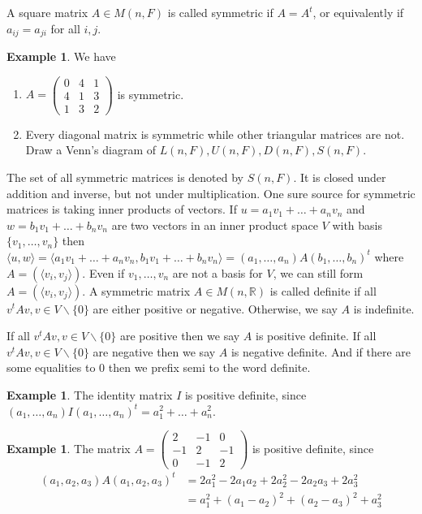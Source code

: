 \documentclass[12pt]{amsart}
\theoremstyle{definition}
\newtheorem{example}[theorem]{Example}
\begin{document}
\dfn A square matrix $A \in M(n, F)$ is called symmetric if $A = A^t$, or equivalently if $a_{ij} = a_{ji}$ for all $i, j$.

\begin{example} We have
\begin{enumerate}[\indent a.]
\item $A = \left(\begin{array}{ccc} 0 & 4 & 1\\ 4 & 1 & 3 \\ 1 & 3 & 2 \end{array}\right)$ is symmetric.
\item Every diagonal matrix is symmetric while other triangular matrices are not. Draw a Venn's diagram of $L(n,F), U(n,F), D(n,F), S(n,F)$.
\end{enumerate}
\end{example}

The set of all symmetric matrices is denoted by $S(n,F)$. It is closed under addition and inverse, but not under multiplication. One sure source for symmetric matrices is taking inner products of vectors. If $u = a_1 v_1 + \ldots + a_n v_n$ and $w = b_1 v_1 + \ldots + b_n v_n$ are two vectors in an inner product space $V$ with basis $\{v_1, \dots, v_n\}$ then $\langle u, w \rangle =  \langle a_1 v_1 + \ldots + a_n v_n, b_1 v_1 + \ldots + b_n v_n \rangle = (a_1, \dots , a_n)A(b_1, \dots , b_n)^t$ where $A = (\langle v_i, v_j \rangle)$. Even if $v_1, \dots, v_n$ are not a basis for $V$, we can still form $A = (\langle v_i, v_j \rangle)$.
\dfn A symmetric matrix $A \in M(n, \mathbb{R})$ is called definite if all $v^tAv, v \in V \backslash \{0\}$ are either positive or negative. Otherwise, we say $A$ is indefinite.

If all $v^tAv, v \in V \backslash \{0\}$ are positive then we say $A$ is positive definite. If all $v^tAv, v \in V \backslash \{0\}$ are negative then we say $A$ is negative definite. And if there are some equalities to 0 then we prefix semi to the word definite.

\begin{example}\label{} The identity matrix $I$ is positive definite, since $(a_1, \dots , a_n)I(a_1, \dots , a_n)^t = a_1^2 + \ldots + a_n^2$.
\end{example}

\begin{example}\label{} The matrix $A = \left(\begin{array}{ccc} 2 & -1 & 0 \\ -1 & 2 & -1 \\ 0 & -1 & 2 \end{array}\right)$ is positive definite, since
\begin{align*}
(a_1, a_2, a_3)A(a_1, a_2, a_3)^t & = 2a_1^2 - 2a_1a_2 + 2a_2^2 - 2a_2a_3 + 2a_3^2 \\
 & = a_1^2 + (a_1 - a_2)^2 + (a_2 - a_3)^2 + a_3^2
\end{align*}
\end{example}
\end{document}
